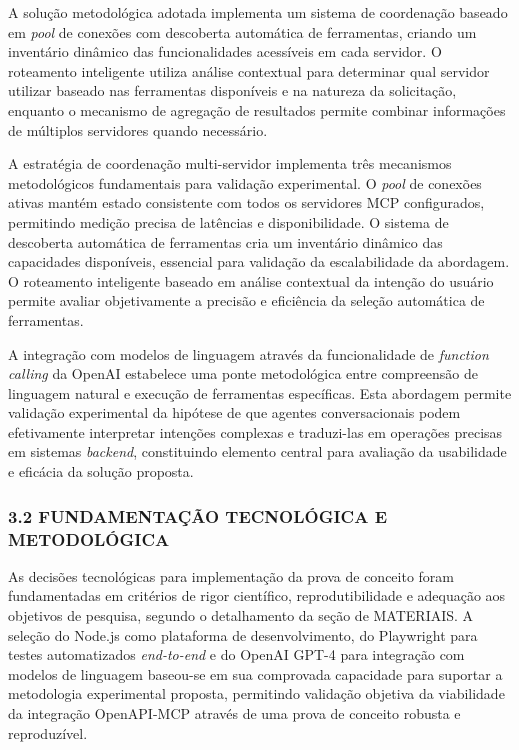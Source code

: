 \documentclass[
]{article}
\begin{document}
A solução metodológica adotada implementa um sistema de coordenação
baseado em \emph{pool} de conexões com descoberta automática de
ferramentas, criando um inventário dinâmico das funcionalidades
acessíveis em cada servidor. O roteamento inteligente utiliza análise
contextual para determinar qual servidor utilizar baseado nas
ferramentas disponíveis e na natureza da solicitação, enquanto o
mecanismo de agregação de resultados permite combinar informações de
múltiplos servidores quando necessário.

A estratégia de coordenação multi-servidor implementa três mecanismos
metodológicos fundamentais para validação experimental. O \emph{pool} de
conexões ativas mantém estado consistente com todos os servidores MCP
configurados, permitindo medição precisa de latências e disponibilidade.
O sistema de descoberta automática de ferramentas cria um inventário
dinâmico das capacidades disponíveis, essencial para validação da
escalabilidade da abordagem. O roteamento inteligente baseado em análise
contextual da intenção do usuário permite avaliar objetivamente a
precisão e eficiência da seleção automática de ferramentas.

A integração com modelos de linguagem através da funcionalidade de
\emph{function calling} da OpenAI estabelece uma ponte metodológica
entre compreensão de linguagem natural e execução de ferramentas
específicas. Esta abordagem permite validação experimental da hipótese
de que agentes conversacionais podem efetivamente interpretar intenções
complexas e traduzi-las em operações precisas em sistemas
\emph{backend}, constituindo elemento central para avaliação da
usabilidade e eficácia da solução proposta.

\subsubsection{3.2 FUNDAMENTAÇÃO TECNOLÓGICA E
METODOLÓGICA}\label{fundamentauxe7uxe3o-tecnoluxf3gica-e-metodoluxf3gica}

As decisões tecnológicas para implementação da prova de conceito foram
fundamentadas em critérios de rigor científico, reprodutibilidade e
adequação aos objetivos de pesquisa, segundo o detalhamento da seção de
MATERIAIS. A seleção do Node.js como plataforma de desenvolvimento, do
Playwright para testes automatizados \emph{end-to-end} e do OpenAI GPT-4
para integração com modelos de linguagem baseou-se em sua comprovada
capacidade para suportar a metodologia experimental proposta, permitindo
validação objetiva da viabilidade da integração OpenAPI-MCP através de
uma prova de conceito robusta e reproduzível.
\end{document}
